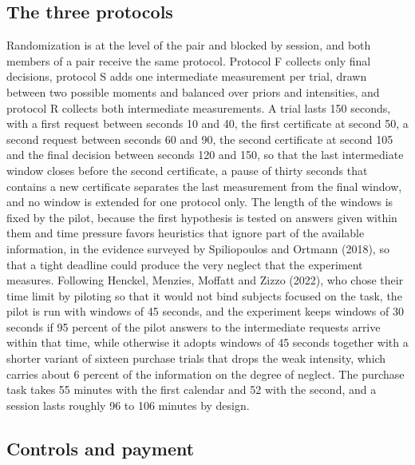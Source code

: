 \documentclass[11pt,a4paper]{article}
\begin{document}
\subsection{The three protocols}

Randomization is at the level of the pair and blocked by session, and both members of a pair receive the same protocol. Protocol F collects only final decisions, protocol S adds one intermediate measurement per trial, drawn between two possible moments and balanced over priors and intensities, and protocol R collects both intermediate measurements. A trial lasts 150 seconds, with a first request between seconds 10 and 40, the first certificate at second 50, a second request between seconds 60 and 90, the second certificate at second 105 and the final decision between seconds 120 and 150, so that the last intermediate window closes before the second certificate, a pause of thirty seconds that contains a new certificate separates the last measurement from the final window, and no window is extended for one protocol only. The length of the windows is fixed by the pilot, because the first hypothesis is tested on answers given within them and time pressure favors heuristics that ignore part of the available information, in the evidence surveyed by Spiliopoulos and Ortmann (2018), so that a tight deadline could produce the very neglect that the experiment measures. Following Henckel, Menzies, Moffatt and Zizzo (2022), who chose their time limit by piloting so that it would not bind subjects focused on the task, the pilot is run with windows of 45 seconds, and the experiment keeps windows of 30 seconds if 95 percent of the pilot answers to the intermediate requests arrive within that time, while otherwise it adopts windows of 45 seconds together with a shorter variant of sixteen purchase trials that drops the weak intensity, which carries about 6 percent of the information on the degree of neglect. The purchase task takes 55 minutes with the first calendar and 52 with the second, and a session lasts roughly 96 to 106 minutes by design.

\subsection{Controls and payment}
\end{document}
